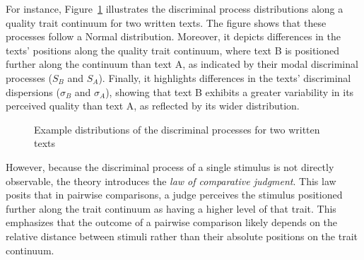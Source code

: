 \documentclass[
  authoryear,
  preprint,
  1p]{elsarticle}
\begin{document}
For instance, Figure~\ref{fig-discriminal_process} illustrates the
discriminal process distributions along a quality trait continuum for
two written texts. The figure shows that these processes follow a Normal
distribution. Moreover, it depicts differences in the texts' positions
along the quality trait continuum, where text B is positioned further
along the continuum than text A, as indicated by their modal discriminal
processes (\(S_{B}\) and \(S_{A}\)). Finally, it highlights differences
in the texts' discriminal dispersions (\(\sigma_{B}\) and
\(\sigma_{A}\)), showing that text B exhibits a greater variability in
its perceived quality than text A, as reflected by its wider
distribution.

\begin{figure}


\caption{\label{fig-discriminal_process}Example distributions of the
discriminal processes for two written texts}

\end{figure}%

However, because the discriminal process of a single stimulus is not
directly observable, the theory introduces the \emph{law of comparative
judgment}. This law posits that in pairwise comparisons, a judge
perceives the stimulus positioned further along the trait continuum as
having a higher level of that trait. This emphasizes that the outcome of
a pairwise comparison likely depends on the relative distance between
stimuli rather than their absolute positions on the trait continuum.
\end{document}
